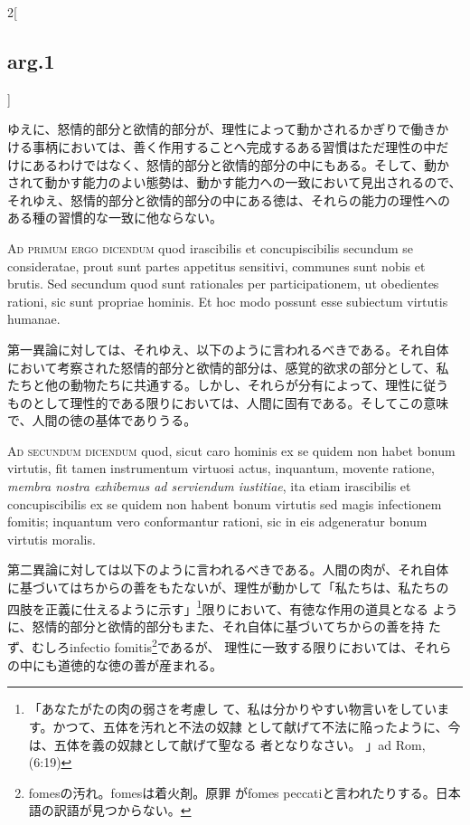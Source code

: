 \documentclass[paper=a4paper,fontsize=10pt,jafontsize=9pt,titlepage]{jlreq}
\begin{document}
\begin{paracol}{2}[\subsection{arg.1}]
\switchcolumn

ゆえに、怒情的部分と欲情的部分が、理性によって動かされるかぎりで働きか
ける事柄においては、善く作用することへ完成するある習慣はただ理性の中だ
けにあるわけではなく、怒情的部分と欲情的部分の中にもある。そして、動か
されて動かす能力のよい態勢は、動かす能力への一致において見出されるので、
それゆえ、怒情的部分と欲情的部分の中にある徳は、それらの能力の理性への
ある種の習慣的な一致に他ならない。

\switchcolumn*[\subsection{ad.1}]

{\scshape Ad primum ergo dicendum} quod irascibilis et concupiscibilis
secundum se consideratae, prout sunt partes appetitus sensitivi,
communes sunt nobis et brutis. Sed secundum quod sunt rationales per
participationem, ut obedientes rationi, sic sunt propriae hominis. Et
hoc modo possunt esse subiectum virtutis humanae.

\switchcolumn

第一異論に対しては、それゆえ、以下のように言われるべきである。それ自体
において考察された怒情的部分と欲情的部分は、感覚的欲求の部分として、私
たちと他の動物たちに共通する。しかし、それらが分有によって、理性に従う
ものとして理性的である限りにおいては、人間に固有である。そしてこの意味
で、人間の徳の基体でありうる。

\switchcolumn*[\subsection{ad.2}]

{\scshape Ad secundum dicendum} quod, sicut caro hominis ex se quidem
non habet bonum virtutis, fit tamen instrumentum virtuosi actus,
inquantum, movente ratione, {\itshape membra nostra exhibemus ad
serviendum iustitiae}, ita etiam irascibilis et concupiscibilis ex se
quidem non habent bonum virtutis sed magis infectionem fomitis;
inquantum vero conformantur rationi, sic in eis adgeneratur bonum
virtutis moralis.

\switchcolumn

第二異論に対しては以下のように言われるべきである。人間の肉が、それ自体
に基づいてはちからの善をもたないが、理性が動かして「私たちは、私たちの
四肢を正義に仕えるように示す」\footnote{「あなたがたの肉の弱さを考慮し
て、私は分かりやすい物言いをしています。かつて、五体を汚れと不法の奴隷
として献げて不法に陥ったように、今は、五体を義の奴隷として献げて聖なる
者となりなさい。 」ad Rom, (6:19)}限りにおいて、有徳な作用の道具となる
ように、怒情的部分と欲情的部分もまた、それ自体に基づいてちからの善を持
たず、むしろinfectio fomitis\footnote{fomesの汚れ。fomesは着火剤。原罪
がfomes peccatiと言われたりする。日本語の訳語が見つからない。}であるが、
理性に一致する限りにおいては、それらの中にも道徳的な徳の善が産まれる。


\end{paracol}
\end{document}
